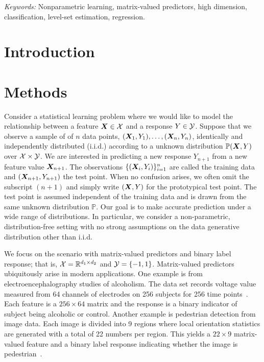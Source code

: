 \documentclass[12pt]{article}
\begin{document}
\noindent%
{\it Keywords:} Nonparametric learning, matrix-valued predictors, high dimension, classification, level-set estimation, regression.
\vfill


\newpage
{} %
\section{Introduction}
\label{sec:intro}

\section{Methods}
\label{sec:meth}
\setcounter{subsection}{-1}

Consider a statistical learning problem where we would like to model the relationship between a feature $\bm X \in \mathcal{X}$ and a response $Y\in\mathcal{Y}$. Suppose that we observe a sample of of $n$ data points, $(\bm X_1,Y_1),\ldots,(\bm X_n,Y_n)$, identically and independently distributed (i.i.d.) according to a unknown distribution $\mathbb{P}(\bm X,Y)$ over $\mathcal{X}\times \mathcal{Y}$. We are interested in predicting a new response $Y_{n+1}$ from a new feature value $\bm X_{n+1}$. The observations $\{(\bm X_i,Y_i)\}_{i=1}^n$ are called the training data and $(\bm X_{n+1},Y_{n+1})$ the test point. When no confusion arises, we often omit the subscript $(n+1)$ and simply write $(\bm X,Y)$ for the prototypical test point. The test point is assumed independent of the training data and is drawn from the same unknown distribution $\mathbb{P}$. Our goal is to make accurate prediction under a wide range of distributions. In particular, we consider a non-parametric, distribution-free setting with no strong assumptions on the data generative distribution other than i.i.d. 


We focus on the scenario with matrix-valued predictors and binary label response; that is, $\mathcal{X}=\mathbb{R}^{d_1\times d_2}$ and $\mathcal{Y}=\{-1,1\}$. Matrix-valued predictors ubiquitously arise in modern applications. One example is from electroencephalography studies of alcoholism. The data set records voltage value measured from 64 channels of electrodes on 256 subjects for 256 time points~\citep{zhou2014regularized}. Each feature is a $256\times 64$ matrix and the response is a binary indicator of subject being alcoholic or control. Another example is pedestrian detection from image data. Each image is divided into 9 regions where local orientation statistics are generated with a total of 22 numbers per region. This yields a $22 \times 9$ matrix-valued feature and a binary label response indicating whether the image is pedestrian~\citep{Shashua2004PedestrianDF}. 
\end{document}
